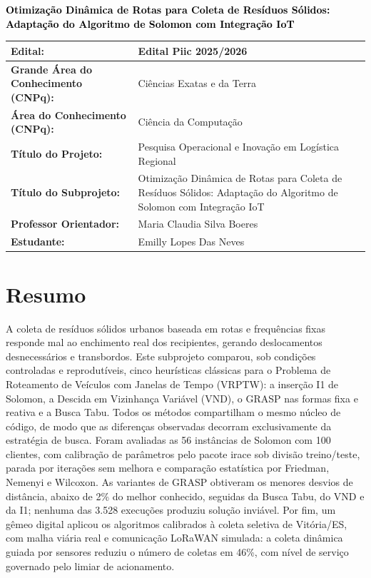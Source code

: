 \documentclass[10pt,a4paper]{article}
\newcommand{\grandeArea}{Ciências Exatas e da Terra}
\newcommand{\tituloSubprojeto}{Otimização Dinâmica de Rotas para Coleta de Resíduos Sólidos: Adaptação do Algoritmo de Solomon com Integração IoT}
\newcommand{\edital}{Edital Piic 2025/2026}
\newcommand{\areaConhecimento}{Ciência da Computação}
\newcommand{\tituloProjeto}{Pesquisa Operacional e Inovação em Logística Regional}
\newcommand{\orientador}{Maria Claudia Silva Boeres}
\newcommand{\estudante}{Emilly Lopes Das Neves}
\newcommand{\placeholderColor}{black}
\begin{document}
\begin{center}
  {\fontsize{14}{17}\selectfont\bfseries\textcolor{\placeholderColor}{\tituloSubprojeto}\par}
\end{center}
\vspace{4pt}

\begin{table}[h!]
  \centering\singlespacing
  \begin{tabularx}{\textwidth}{|>{\bfseries}p{}|L|}
    \hline
    Edital: & \textbf{\edital} \\ \hline
    Grande Área do Conhecimento (CNPq): & \grandeArea \\ \hline
    Área do Conhecimento (CNPq): & \areaConhecimento \\ \hline
    Título do Projeto: & \tituloProjeto \\ \hline
    Título do Subprojeto: & \tituloSubprojeto \\ \hline
    Professor Orientador: & \orientador \\ \hline
    Estudante: & \estudante \\ \hline
  \end{tabularx}
\end{table}

\section*{Resumo}
A coleta de resíduos sólidos urbanos baseada em rotas e frequências fixas responde mal ao enchimento real dos recipientes, gerando deslocamentos desnecessários e transbordos. Este subprojeto comparou, sob condições controladas e reprodutíveis, cinco heurísticas clássicas para o Problema de Roteamento de Veículos com Janelas de Tempo (VRPTW): a inserção I1 de Solomon, a Descida em Vizinhança Variável (VND), o GRASP nas formas fixa e reativa e a Busca Tabu. Todos os métodos compartilham o mesmo núcleo de código, de modo que as diferenças observadas decorram exclusivamente da estratégia de busca. Foram avaliadas as 56 instâncias de Solomon com 100 clientes, com calibração de parâmetros pelo pacote irace sob divisão treino/teste, parada por iterações sem melhora e comparação estatística por Friedman, Nemenyi e Wilcoxon. As variantes de GRASP obtiveram os menores desvios de distância, abaixo de 2\% do melhor conhecido, seguidas da Busca Tabu, do VND e da I1; nenhuma das 3.528 execuções produziu solução inviável. Por fim, um gêmeo digital aplicou os algoritmos calibrados à coleta seletiva de Vitória/ES, com malha viária real e comunicação LoRaWAN simulada: a coleta dinâmica guiada por sensores reduziu o número de coletas em 46\%, com nível de serviço governado pelo limiar de acionamento.
\end{document}
